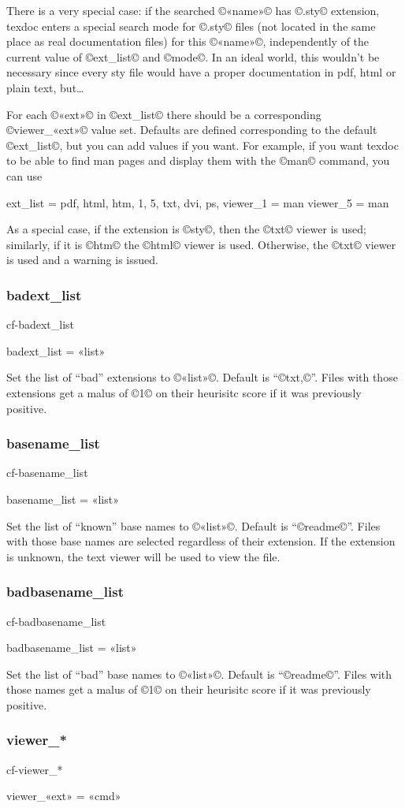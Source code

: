 \documentclass[a4paper, oneside]{scrartcl}
\makeatletter
\newif\ifframed
\newenvironment{cmdsubsub}[2]{%
  \framedfalse \commandes\subsubsection{#1}{#2}%
  }{%
  \endcommandes}
\newenvironment{htcode}{%
  \SaveVerbatim[samepage, gobble=2]{verbmat}%
  }{%
  \endSaveVerbatim
  \par\medskip\noindent\hspace*{\parindent}%
  \BUseVerbatim{verbmat}%
  \par\medskip\@endpetrue}
\makeatother
\begin{document}
There is a very special case: if the searched ©«name»© has ©.sty© extension,
texdoc enters a special search mode for ©.sty© files (not located in the same
place as real documentation files) for this ©«name»©, independently of the
current value of ©ext_list© and ©mode©. In an ideal world, this wouldn't be
necessary since every sty file would have a proper documentation in pdf, html
or plain text, but\dots

For each ©«ext»© in ©ext_list© there should be a corresponding ©viewer_«ext»©
value set.  Defaults are defined corresponding to the default ©ext_list©, but
you can add values if you want.  For example, if you want texdoc to be able
to find man pages and display them with the ©man© command, you can use
\begin{htcode}
  ext_list = pdf, html, htm, 1, 5, txt, dvi, ps,
  viewer_1 = man
  viewer_5 = man
\end{htcode}

As a special case, if the extension is ©sty©, then the ©txt© viewer is used;
similarly, if it is ©htm© the ©html© viewer is used. Otherwise, the ©txt©
viewer is used and a warning is issued.

\begin{cmdsubsub}{badext_list}{cf-badext_list}
  badext_list = «list»
\end{cmdsubsub}

Set the list of ``bad'' extensions to ©«list»©.  Default is ``©txt,©''. Files
with those extensions get a malus of ©1© on their heurisitc score if it was
previously positive.

\begin{cmdsubsub}{basename_list}{cf-basename_list}
  basename_list = «list»
\end{cmdsubsub}

Set the list of ``known'' base names to ©«list»©.  Default is ``©readme©''.
Files with those base names are selected regardless of their extension. If the
extension is unknown, the text viewer will be used to view the file.

\begin{cmdsubsub}{badbasename_list}{cf-badbasename_list}
  badbasename_list = «list»
\end{cmdsubsub}

Set the list of ``bad'' base names to ©«list»©.  Default is ``©readme©''. Files
with those names get a malus of ©1© on their heurisitc score if it was
previously positive.

\begin{cmdsubsub}{viewer_*}{cf-viewer_*}
  viewer_«ext» = «cmd»
\end{cmdsubsub}
\end{document}

